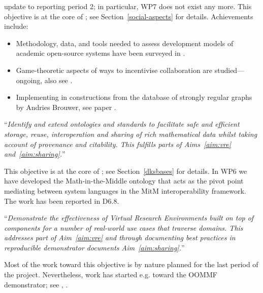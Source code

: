 \begin{compactenum}[\bf O1\rm:]
\begin{oldpart}{update to reporting period 2; in particular, WP7 does not exist any more.}
  This objective is at the core of ; see
  Section~\ref{social-aspects} for details.
  Achievements include:
  \begin{itemize}
  \item Methodology, data, and tools needed to assess
    development models of academic open-source systems have been surveyed in
    .
  \item Game-theoretic aspects of ways to incentivise
  collaboration are studied---ongoing, also see \cite{Pavlou:2016:MCI:2936924.2936934}.
  \item Implementing in \Sage constructions from the database of
  strongly regular graphs by Andries Brouwer, see paper \cite{2016arXiv160100181C}.
  \end{itemize}
\end{oldpart}

\item \label{objective:data} ``\emph{Identify and extend ontologies and
  standards to facilitate safe and efficient storage, reuse,
  interoperation and sharing of rich mathematical data whilst taking
  account of provenance and citability. This fulfills parts of
  Aims~\ref{aim:vre} and~\ref{aim:sharing}.}''
 
This objective is at the core of ; see Section~\ref{dksbases} for
details. In WP6 we have developed the Math-in-the-Middle ontology that acts as the pivot
point mediating between system languages in the MitM interoperability framework. The work
has been reported in D6.8.

\item \label{objective:demo} ``\emph{Demonstrate the effectiveness of Virtual
  Research Environments built on top of \ODK components for a
  number of real-world use cases that traverse domains. This addresses
  part of Aim~\ref{aim:vre} and through documenting best practices in
  reproducible demonstrator documents Aim~\ref{aim:sharing}.}''

Most of the work toward this objective is by nature planned for the last period of the \pn
project. Nevertheless, work has started e.g.  toward the OOMMF demonstrator; see
,
.


\end{compactenum}
